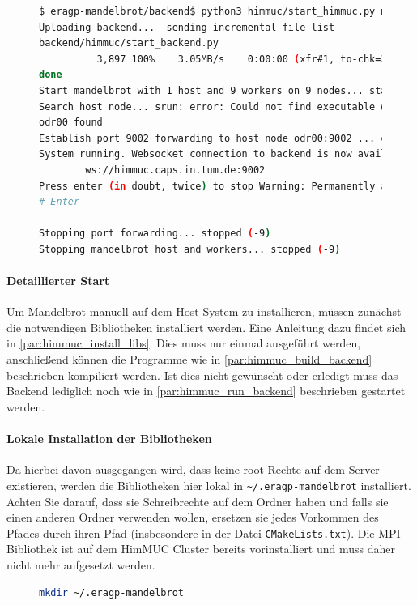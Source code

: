 \begin{figure}
	\begin{lstlisting}[language=bash, caption={Beispielausgabe bei Start der Entwicklungsumbegung auf dem HimMUC}, label={shell:start_himmuc_example}]
$ eragp-mandelbrot/backend$ python3 himmuc/start_himmuc.py muendler 10 9
Uploading backend...  sending incremental file list
backend/himmuc/start_backend.py
          3,897 100%    3.05MB/s    0:00:00 (xfr#1, to-chk=35/62)
done
Start mandelbrot with 1 host and 9 workers on 9 nodes... started mandelbrot
Search host node... srun: error: Could not find executable worker
odr00 found
Establish port 9002 forwarding to host node odr00:9002 ... established
System running. Websocket connection to backend is now available at
        ws://himmuc.caps.in.tum.de:9002
Press enter (in doubt, twice) to stop Warning: Permanently added the ED25519 host key for IP address '10.42.0.54' to the list of known hosts.
# Enter

Stopping port forwarding... stopped (-9)
Stopping mandelbrot host and workers... stopped (-9)
    \end{lstlisting}
\end{figure}

\paragraph{Detaillierter Start}\label{par:detailed_himmuc}

Um Mandelbrot manuell auf dem Host-System zu installieren,
müssen zunächst die notwendigen Bibliotheken installiert werden.
Eine Anleitung dazu findet sich in \autoref{par:himmuc_install_libs}.
Dies muss nur einmal ausgeführt werden, anschließend können die
Programme wie in \autoref{par:himmuc_build_backend} beschrieben kompiliert werden.
Ist dies nicht gewünscht oder erledigt muss das Backend lediglich noch wie
in \autoref{par:himmuc_run_backend} beschrieben gestartet werden.


\paragraph{Lokale Installation der Bibliotheken}\label{par:himmuc_install_libs}


Da hierbei davon ausgegangen wird, dass keine root-Rechte auf dem
Server existieren, werden die Bibliotheken hier lokal in \verb|~/.eragp-mandelbrot|
installiert.
Achten Sie darauf, dass sie Schreibrechte auf dem Ordner haben und
falls sie einen anderen Ordner verwenden wollen,
ersetzen sie jedes Vorkommen des Pfades durch ihren Pfad (insbesondere in der Datei \verb|CMakeLists.txt|).
Die MPI-Bibliothek ist auf dem HimMUC Cluster bereits vorinstalliert
und muss daher nicht mehr aufgesetzt werden.
\begin{figure}[h!]
	\begin{lstlisting}[language=bash, caption={Erstellen des Installationsordners}]
mkdir ~/.eragp-mandelbrot
    \end{lstlisting}
\end{figure}

